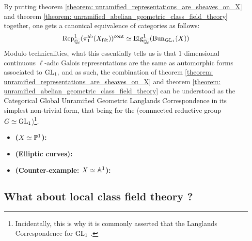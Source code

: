         \begin{remark} \label{remark: unramified_abelian_geometric_class_field_theory_explanation}
            By putting theorem \ref{theorem: unramified_representations_are_sheaves_on_X} and theorem \ref{theorem: unramified_abelian_geometric_class_field_theory} together, one gets a canonical equivalence of categories as follows:
                $$\Rep_{\overline{\Q_{\ell}}}^1(\pi_1^{\ab}(X_{\fet}))^{\cont} \cong \Eig^1_{\overline{\Q_{\ell}}}(\Bun_{\GL_1}(X))$$
            Modulo technicalities, what this essentially tells us is that $1$-dimensional continuous $\ell$-adic Galois representations are the same as automorphic forms associated to $\GL_1$, and as such, the combination of theorem \ref{theorem: unramified_representations_are_sheaves_on_X} and theorem \ref{theorem: unramified_abelian_geometric_class_field_theory} can be understood as the Categorical Global Unramified Geometric Langlands Correspondence in its simplest non-trivial form, that being for the (connnected reductive group $G \cong \GL_1$)\footnote{Incidentally, this is why it is commonly asserted that the Langlands Correspondence for $\GL_1$ .}. 
        \end{remark}
        \begin{example} \label{example: geometric_reciprocity}
            \noindent
            \begin{itemize}
                \item \textbf{($X \cong \P^1$):}
                \item \textbf{(Elliptic curves):}
                \item \textbf{(Counter-example: $X \cong \A^1$):}
            \end{itemize}
        \end{example}
    
    \subsection{What about local class field theory ?}